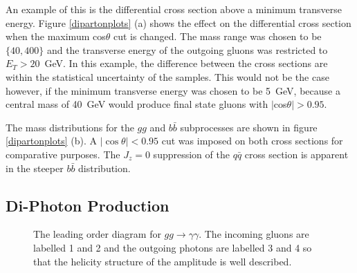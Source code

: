 An example of this is the differential cross section above a minimum transverse energy. Figure \ref{dipartonplots} (a) shows the effect on the differential cross section when the maximum cos$\theta$ cut is changed. The mass range was chosen to be $\{40, 400\}$ and the transverse energy of the outgoing gluons was restricted to $E_T>20$~GeV. In this example, the difference between the cross sections are within the statistical uncertainty of the samples. This would not be the case however, if the minimum transverse energy was chosen to be 5~GeV, because a central mass of 40~GeV would produce final state gluons with $|$cos$\theta|>0.95$. 

The mass distributions for the $gg$ and $b\bar{b}$ subprocesses are shown in figure \ref{dipartonplots} (b). A $|\cos\theta| < 0.95$ cut was imposed on both cross sections for comparative purposes. The $J_z=0$ suppression of the $q\bar{q}$ cross section is apparent in the steeper $b\bar{b}$ distribution. %


\subsection{Di-Photon Production}

\begin{figure} 
\centering
\caption[The leading order central exclusive diagram for $gg \rightarrow \gamma \gamma$]{The leading order diagram for $gg \rightarrow \gamma \gamma$. The incoming gluons are labelled 1 and 2 and the outgoing photons are labelled 3 and 4 so that the helicity structure of the amplitude is well described. \label{diphotonfeyn}}
\end{figure}


